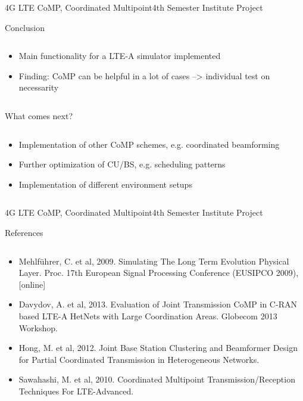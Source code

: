 \documentclass[xcolor={cmyk}]{beamer}
\begin{document}
 \begin{frame}{4G LTE CoMP, Coordinated Multipoint}{4th Semester Institute Project}
	 \begin{block}{Conclusion}
	 	\begin{columns}
			\begin{column}{.9\textwidth}
				\begin{itemize}
					\item Main functionality for a LTE-A simulator implemented
					\item Finding: CoMP can be helpful in a lot of cases --> individual test on necessarity
				\end{itemize}
			\end{column}
		\end{columns}
	 \end{block}
	 \begin{block}{What comes next?}
	 	\begin{columns}
			\begin{column}{.9\textwidth}
				\begin{itemize}
					\item Implementation of other CoMP schemes, e.g. coordinated beamforming
					\item Further optimization of CU/BS, e.g. scheduling patterns
					\item Implementation of different environment setups
				\end{itemize}
			\end{column}
		\end{columns}
	 \end{block}
 \end{frame}


 \begin{frame}{4G LTE CoMP, Coordinated Multipoint}{4th Semester Institute Project}
	 \begin{block}{References}
	 	\begin{columns}
			\begin{column}{.9\textwidth}
				\begin{itemize}
					\item Mehlführer, C. et al, 2009. Simulating The Long Term Evolution Physical Layer. Proc. 17th European Signal Processing Conference (EUSIPCO 2009), [online]
					\item Davydov, A. et al, 2013. Evaluation of Joint Transmission CoMP in C-RAN based LTE-A HetNets with Large Coordination Areas. Globecom 2013 Workshop.
					\item Hong, M. et al, 2012. Joint Base Station Clustering and Beamformer Design for Partial Coordinated Transmission in Heterogeneous Networks.
					\item Sawahashi, M. et al, 2010. Coordinated Multipoint Transmission/Reception Techniques For LTE-Advanced.
				\end{itemize}
			\end{column}
		\end{columns}
	 \end{block}
 \end{frame}
\end{document}
